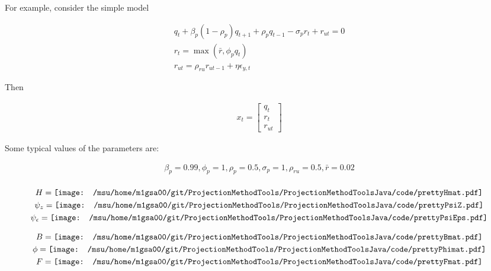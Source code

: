 For example, consider the simple model


\begin{gather*}
q_{t} +\beta_p(1 - \rho_p)q_{t + 1} + \rho_pq_{t - 1} - \sigma_pr_{t} +
     r_{ut}=0\\
 r_{t} = \max (\bar{r}, \phi_pq_{t}) \\
 r_{ut} = \rho_{ru} r_{ut - 1} + \eta \epsilon_{y,t}
\end{gather*}

Then 
\newcommand{\xtmVec}{  \begin{bmatrix}
    q_t\\r_{t}\\r_{ut}
  \end{bmatrix}
}


\begin{gather*}
  x_t=\xtmVec
\end{gather*}

Some typical values of the parameters are:

\begin{gather*}
  \beta_p = 0.99, \phi_p = 1, 
\rho_p = 0.5, \sigma_p = 1, \rho_{ru} = 0.5,
  \bar{r} = 0.02 \\
\end{gather*}



\begin{gather*}
  H= \vcenter{\hbox{\texttt{[image: /msu/home/m1gsa00/git/ProjectionMethodTools/ProjectionMethodToolsJava/code/prettyHmat.pdf]}}}\\
\psi_z=   \vcenter{\hbox{\texttt{[image: /msu/home/m1gsa00/git/ProjectionMethodTools/ProjectionMethodToolsJava/code/prettyPsiZ.pdf]}}}\\
\psi_\epsilon=   \vcenter{\hbox{\texttt{[image: /msu/home/m1gsa00/git/ProjectionMethodTools/ProjectionMethodToolsJava/code/prettyPsiEps.pdf]}}}\\
\end{gather*}




 \begin{gather*}
B=   \vcenter{\hbox{\texttt{[image: /msu/home/m1gsa00/git/ProjectionMethodTools/ProjectionMethodToolsJava/code/prettyBmat.pdf]}}}\\
\phi=   \vcenter{\hbox{\texttt{[image: /msu/home/m1gsa00/git/ProjectionMethodTools/ProjectionMethodToolsJava/code/prettyPhimat.pdf]}}}\\
F=   \vcenter{\hbox{\texttt{[image: /msu/home/m1gsa00/git/ProjectionMethodTools/ProjectionMethodToolsJava/code/prettyFmat.pdf]}}}
 \end{gather*}

